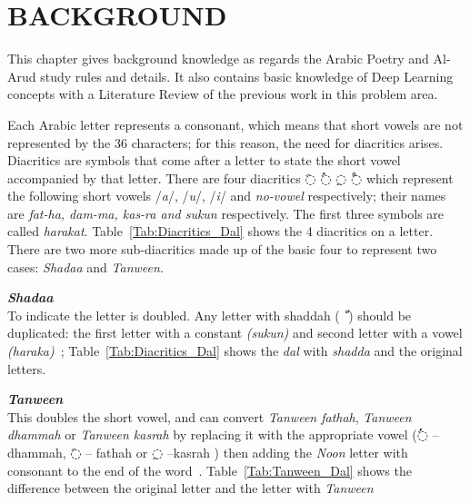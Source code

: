 \chapter{\uppercase{Background}}\label{Ch:Background}
This chapter gives background knowledge as regards the Arabic Poetry and Al-Arud study rules and details. It also contains basic knowledge of Deep Learning concepts with a Literature Review of the previous work in this problem area. 

Each Arabic letter represents a consonant, which means that short vowels are not represented by the 36 characters; for this
reason, the need for diacritics arises. Diacritics are symbols that come after a letter to state the short vowel accompanied by that letter. There are four diacritics \textarabic{◌َ} \textarabic{◌ُ}
\textarabic{◌ِ} \textarabic{◌ْ} which represent the following short vowels /\textit{a}/, /\textit{u}/, /\textit{i}/ and \textit{no-vowel} respectively; their names are \textit{fat-ha, dam-ma, kas-ra and sukun} respectively. The first three symbols are called \textit{harakat}. Table~\ref{Tab:Diacritics_Dal} shows the 4 diacritics on a letter.
There are two more sub-diacritics made up of the basic four to represent two cases: \textit{Shadaa} and \textit{Tanween}.%

\begin{definition}\label{def:shadaa_definition}
  \textbf{\textit{Shadaa}}  \hfill \\
To indicate the letter is doubled. Any letter with shaddah (\textarabic{ ّ }) should be duplicated: the first letter with a constant \textit{(sukun)} and second letter with a vowel \textit{(haraka)}~\cite{Alnagdawi2013}; Table~\ref{Tab:Diacritics_Dal} shows the \textit{dal} with \textit{shadda} and the original letters. %
%
\end{definition}
\begin{definition}\label{def:tanween_definition}
  \textbf{\textit{Tanween}} \hfill \\
  This doubles the short vowel, and can convert \textit{Tanween fathah}, \textit{Tanween dhammah} or \textit{Tanween kasrah} by replacing it with the appropriate vowel (\textarabic{◌ُ} – dhammah, \textarabic{◌َ} – fathah or \textarabic{◌ِ} –kasrah ) then adding the \textit{Noon} letter with consonant to the end of the word~\cite{Alnagdawi2013}. Table~\ref{Tab:Tanween_Dal} shows the difference between the original letter and the letter with \textit{Tanween}
  
\end{definition}%


